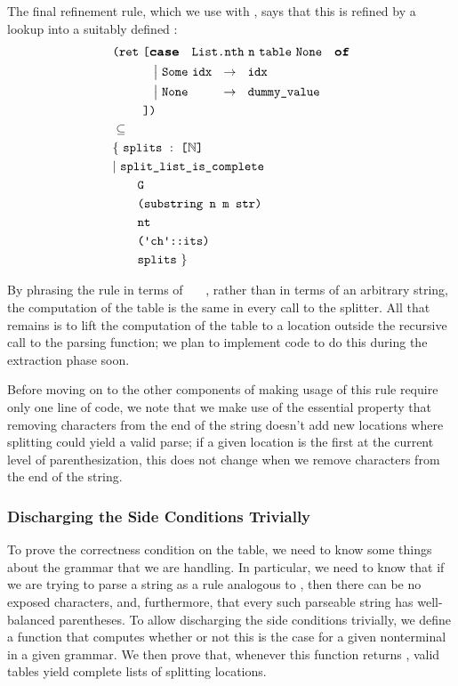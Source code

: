     The final refinement rule, which we use with , says that this is refined by a lookup into a suitably defined :
\begin{align*}
& \texttt{(}\fname{ret}~\texttt{[}\caseof{\fname{List.nth}~\farg{n}~\farg{table}~\None} \\
&\phantom{\texttt{(}\fname{ret}~\texttt{[}}\acase{\Some{\farg{idx}}}{\farg{idx}} \\
&\phantom{\texttt{(}\fname{ret}~\texttt{[}}\acase{\aswidthof{\None}{\Some{\farg{idx}}}}{\farg{dummy\_value}} \\
&\phantom{\texttt{(}\fname{ret}~}\texttt{])} \\
& \subseteq \\
& \{~\fname{splits}~\oftypesep~\typelist{\mathbb{N}} \\
&|~\fname{split\_list\_is\_complete} \\
&\qquad\farg{G} \\
&\qquad\coqgroup{\fname{substring}~\farg{n}~\farg{m}~\farg{str}} \\
&\qquad\nt{\farg{nt}} \\
&\qquad\coqgroup{\cons{\terminal{\farg{ch}}}{\farg{its}}} \\
&\qquad\fname{splits}~\}     
\end{align*}

    By phrasing the rule in terms of ~~~, rather than in terms of an arbitrary string, the computation of the table is the same in every call to the splitter.  All that remains is to lift the computation of the table to a location outside the recursive call to the parsing function; we plan to implement code to do this during the extraction phase soon.\label{sec:must-lift-table-mention}
    
    Before moving on to the other components of making usage of this rule require only one line of code, we note that we make use of the essential property that removing characters from the end of the string doesn't add new locations where splitting could yield a valid parse; if a given location is the first \terminal{+} at the current level of parenthesization, this does not change when we remove characters from the end of the string.
    
  \subsubsection{Discharging the Side Conditions Trivially}
    To prove the correctness condition on the table, we need to know some things about the grammar that we are handling.  In particular, we need to know that if we are trying to parse a string as a rule analogous to , then there can be no exposed \terminal{+} characters, and, furthermore, that every such parseable string has well-balanced parentheses.  To allow discharging the side conditions trivially, we define a function that computes whether or not this is the case for a given nonterminal in a given grammar.  We then prove that, whenever this function returns \true, valid tables yield complete lists of splitting locations.
    
